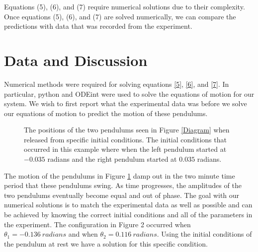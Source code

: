 \documentclass[twocolumn]{article}
\begin{document}
Equations (5), (6), and (7) require numerical solutions due to their complexity. Once equations (5), (6), and (7) are solved numerically, we can compare the predictions with data that was recorded from the experiment.
\section*{Data and Discussion}
Numerical methods were required for solving equations \ref{5}, \ref{6}, and \ref{7}. In particular, python and ODEint were used to solve the equations of motion for our system. We wish to first report what the experimental data was before we solve our equations of motion to predict the motion of these pendulums.
\begin{figure}[htbp]
\begin{center}
\caption{The positions of the two pendulums seen in Figure \ref{Diagram} when released from specific initial conditions. The initial conditions that occurred in this example where when the left pendulum started at $-0.035$ radians and the right pendulum started at $0.035$ radians.}
\label{LR1}
\end{center}
\end{figure}
\newline
The motion of the pendulums in Figure \ref{LR1} damp out in the two minute time period that these pendulums swing. As time progresses, the amplitudes of the two pendulums eventually become equal and out of phase. The goal with our numerical solutions is to match the experimental data as well as possible and can be achieved by knowing the correct initial conditions and all of the parameters in the experiment. The configuration in Figure 2 occurred when $\theta_{1}=-0.136\ radians$ and when $\theta_{2}=0.116\ radians$. Using the initial conditions of the pendulum at rest we have a solution for this specific condition.
\end{document}
